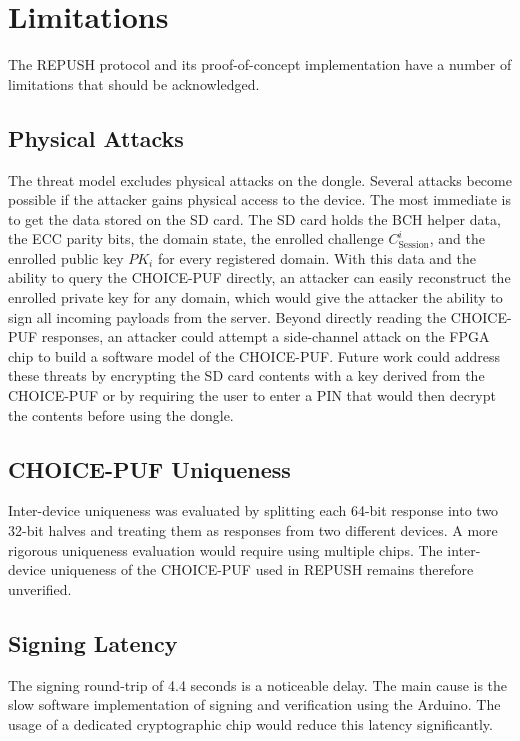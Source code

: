 \section{Limitations}

The REPUSH protocol and its proof-of-concept implementation have a number of limitations that should be acknowledged.

\subsection{Physical Attacks}
The threat model excludes physical attacks on the dongle. Several attacks become possible if the attacker gains physical access to the device. The most immediate is to get the data stored on the SD card. The SD card holds the BCH helper data, the ECC parity bits,  the domain state, the enrolled challenge $C^i_\text{Session}$, and the enrolled public key $PK_i$ for every registered domain. With this data and the ability to query the CHOICE-PUF directly, an attacker can easily reconstruct the enrolled private key for any domain, which would give the attacker the ability to sign all incoming payloads from the server. Beyond directly reading the CHOICE-PUF responses, an attacker could attempt a side-channel attack on the FPGA chip to build a software model of the CHOICE-PUF. Future work could address these threats by encrypting the SD card contents with a key derived from the CHOICE-PUF or by requiring the user to enter a PIN that would then decrypt the contents before using the dongle. 

\subsection{CHOICE-PUF Uniqueness}
Inter-device uniqueness was evaluated by splitting each 64-bit response into two 32-bit halves and treating them as responses from two different devices. A more rigorous uniqueness evaluation would require using multiple chips. The inter-device uniqueness of the CHOICE-PUF used in REPUSH remains therefore unverified.

\subsection{Signing Latency}
The signing round-trip of 4.4 seconds is a noticeable delay. The main cause is the slow software implementation of signing and verification using the Arduino. The usage of a dedicated cryptographic chip would reduce this latency significantly.

